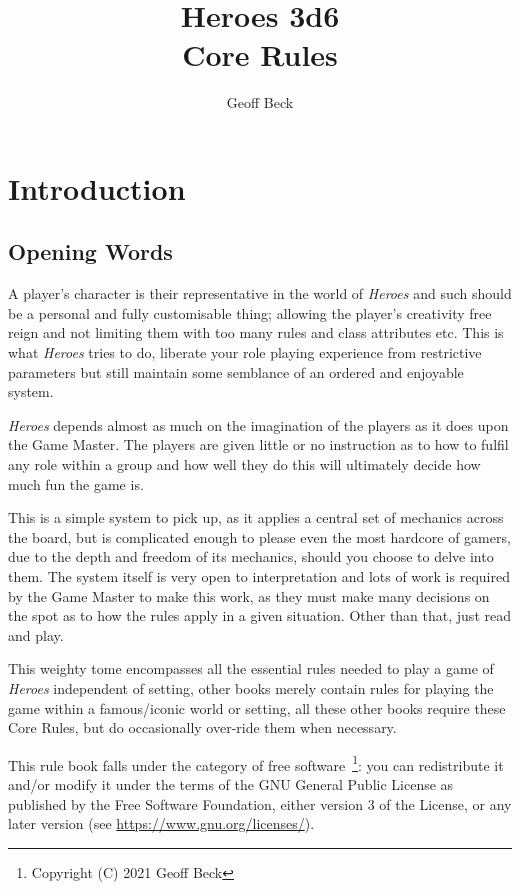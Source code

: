 \documentclass[a4paper,10pt,oneside]{book}
\title{\textbf{\huge Heroes 3d6\\Core Rules}}
\author{Geoff Beck}
\date{}
\begin{document}
\maketitle
\frontmatter
\tableofcontents
\mainmatter

\chapter{Introduction}

\section{Opening Words}
A player's character is their representative in the world of \textit{Heroes} and such should be a personal and fully customisable thing; allowing the player's creativity free reign and not limiting them with too many rules and class attributes etc. This is what \textit{Heroes} tries to do, liberate your role playing experience from restrictive parameters but still maintain some semblance of an ordered and enjoyable system.

\textit{Heroes} depends almost as much on the imagination of the players as it does upon the Game Master. The players are given little or no instruction as to how to fulfil any role within a group and how well they do this will ultimately decide how much fun the game is.

This is a simple system to pick up, as it applies a central set of mechanics across the board, but is complicated enough to please even the most hardcore of gamers, due to the depth and freedom of its mechanics, should you choose to delve into them. The system itself is very open to interpretation and lots of work is required by the Game Master to make this work, as they must make many decisions on the spot as to how the rules apply in a given situation. Other than that, just read and play.

This weighty tome encompasses all the essential rules needed to play a game of \textit{Heroes} independent of setting, other books merely contain rules for playing the game within a famous/iconic world or setting, all these other books require these Core Rules, but do occasionally over-ride them when necessary.

This rule book falls under the category of free software~\footnote{Copyright (C) 2021  Geoff Beck}: you can redistribute it and/or modify
it under the terms of the GNU General Public License as published by
the Free Software Foundation, either version 3 of the License, or any later version (see \url{https://www.gnu.org/licenses/}).
\end{document}
